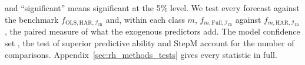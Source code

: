 \begin{itemize}
  and ``significant'' means significant at the 5\% level. We test
  every forecast against the benchmark $f_{\mathrm{OLS},\mathrm{HAR},\mathcal I_{\mathrm{rh}}}$ and, within each class
  $m$, $f_{m,\mathrm{Full},\mathcal I_{\mathrm{rh}}}$ against $f_{m,\mathrm{HAR},\mathcal I_{\mathrm{rh}}}$, the
  paired measure of what the exogenous predictors add. The model confidence set \citep{HansenLundeNason2011}, the
  test of superior predictive ability \citep{Hansen2005} and StepM \citep{RomanoWolf2005} account for the number of
  comparisons. Appendix~\ref{sec:rh_methods_tests} gives every statistic in full.
\end{itemize}

